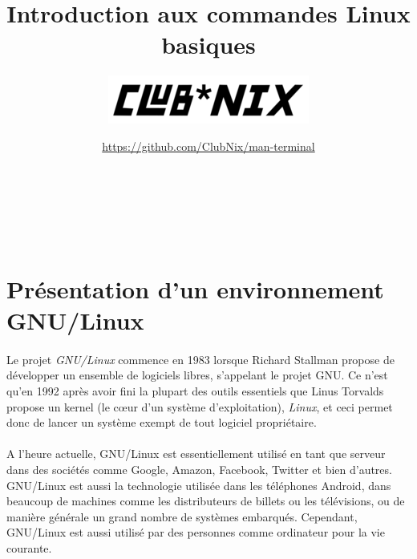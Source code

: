 \documentclass[french, a4paper, 12pt, titlepage]{article}
\begin{document}
\title{Introduction aux commandes Linux basiques}
\author{\includegraphics[scale=0.7]{clubnix}}
\date{\url{https://github.com/ClubNix/man-terminal}}

\maketitle

\vfill
\pagebreak
\newpage
\thispagestyle{empty}
~


\strut\thispagestyle{empty}
\vfill
\pagebreak
\tableofcontents
\strut\thispagestyle{empty}

\vfill
\pagebreak
\newpage
\thispagestyle{empty}
~
\pagebreak

\setcounter{page}{1}

\section{Présentation d'un environnement GNU/Linux}

\paragraph{}
Le projet \textit{GNU/Linux} commence en 1983 lorsque Richard Stallman propose
de développer un ensemble de logiciels libres, s'appelant le projet GNU. Ce
n'est qu'en 1992 après avoir fini la plupart des outils essentiels que Linus
Torvalds propose un kernel (le cœur d'un système d'exploitation),
\textit{Linux}, et ceci permet donc de lancer un système exempt de tout
logiciel propriétaire.

\paragraph{}
A l'heure actuelle, GNU/Linux est essentiellement utilisé en tant que serveur
dans des sociétés comme Google, Amazon, Facebook, Twitter et bien d'autres.
GNU/Linux est aussi la technologie utilisée dans les téléphones Android, dans
beaucoup de machines comme les distributeurs de billets ou les télévisions, ou
de manière générale un grand nombre de systèmes embarqués. Cependant, GNU/Linux
est aussi utilisé par des personnes comme ordinateur pour la vie courante.
\end{document}
